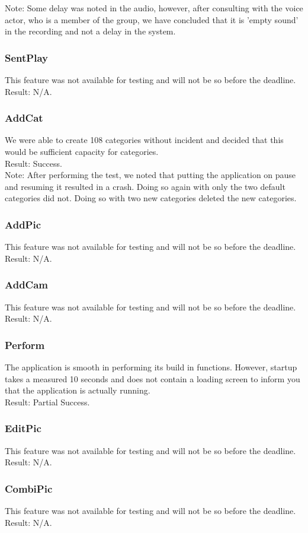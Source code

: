 Note: Some delay was noted in the audio, however, after consulting with the voice actor, who is a member of the group, we have concluded that it is 'empty sound' in the recording and not a delay in the system.

\subsubsection*{SentPlay}
This feature was not available for testing and will not be so before the deadline.\\

Result: N/A.

\subsubsection*{AddCat}
We were able to create 108 categories without incident and decided that this would be sufficient capacity for categories.\\

Result: Success.\\

Note: After performing the test, we noted that putting the application on pause and resuming it resulted in a crash. Doing so again with only the two default categories did not. Doing so with two new categories deleted the new categories.

\subsubsection*{AddPic}
This feature was not available for testing and will not be so before the deadline.\\

Result: N/A.

\subsubsection*{AddCam}
This feature was not available for testing and will not be so before the deadline.\\

Result: N/A.

\subsubsection*{Perform}
The application is smooth in performing its build in functions.
However, startup takes a measured  10 seconds and does not contain a loading screen to inform you that the application is actually running.\\

Result: Partial Success.

\subsubsection*{EditPic}
This feature was not available for testing and will not be so before the deadline.\\

Result: N/A.

\subsubsection*{CombiPic}
This feature was not available for testing and will not be so before the deadline.\\

Result: N/A.